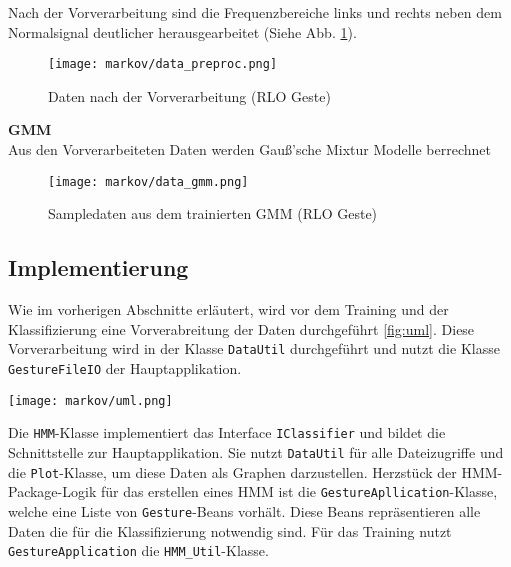 Nach der Vorverarbeitung sind die Frequenzbereiche links und rechts neben dem Normalsignal deutlicher herausgearbeitet (Siehe Abb. \ref{fig:data_preproc}).  

\begin{figure}[htbp] \centering
    \texttt{[image: markov/data\_preproc.png]}
    \caption{Daten nach der Vorverarbeitung (\acl{RLO} Geste)}
    \label{fig:data_preproc}
\end{figure}

\textbf{\acl{GMM}} \\
Aus den Vorverarbeiteten Daten werden Gauß’sche Mixtur Modelle berrechnet

\begin{figure}[htbp] \centering
    \texttt{[image: markov/data\_gmm.png]}
    \caption{Sampledaten aus dem trainierten \acl{GMM} (\acl{RLO} Geste)}
    \label{fig:data_gmm}
\end{figure}

\subsection{Implementierung}  \label{sec:impl}
Wie im vorherigen Abschnitte erläutert, wird vor dem Training und der Klassifizierung eine Vorverabreitung der Daten durchgeführt \ref{fig:uml}.
Diese Vorverarbeitung wird in der Klasse \texttt{DataUtil} durchgeführt und nutzt die Klasse \texttt{GestureFileIO} der Hauptapplikation.

\begin{figure*}[htbp] \centering
    \texttt{[image: markov/uml.png]}
    \caption{Klassendiagram und Abhängigkeiten des \acl{HMM} Klassifikators}
    \label{fig:uml}
\end{figure*}


Die \texttt{HMM}-Klasse implementiert das Interface \texttt{IClassifier} und bildet die Schnittstelle zur Hauptapplikation. Sie nutzt \texttt{DataUtil}
 für alle Dateizugriffe und die \texttt{Plot}-Klasse, um diese Daten als Graphen darzustellen. Herzstück der HMM-Package-Logik für das erstellen eines
  \acl{HMM} ist die \texttt{GestureApllication}-Klasse, welche eine Liste von \texttt{Gesture}-Beans vorhält. Diese Beans repräsentieren alle Daten die für 
 die Klassifizierung notwendig sind. Für das Training nutzt \texttt{GestureApplication} die \texttt{HMM\_Util}-Klasse.

